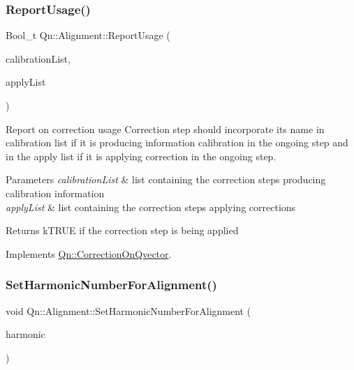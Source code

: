 \mbox{\label{classQn_1_1Alignment_af8ef33833778e9af4bdb7b82f679c941}} 
\subsubsection{\texorpdfstring{Report\+Usage()}{ReportUsage()}}
{\footnotesize\ttfamily Bool\+\_\+t Qn\+::\+Alignment\+::\+Report\+Usage (\begin{DoxyParamCaption}\item[{T\+List $\ast$}]{calibration\+List,  }\item[{T\+List $\ast$}]{apply\+List }\end{DoxyParamCaption})\hspace{0.3cm}{\ttfamily [virtual]}}

Report on correction usage Correction step should incorporate its name in calibration list if it is producing information calibration in the ongoing step and in the apply list if it is applying correction in the ongoing step. 
\begin{DoxyParams}{Parameters}
{\em calibration\+List} & list containing the correction steps producing calibration information \\
\hline
{\em apply\+List} & list containing the correction steps applying corrections \\
\hline
\end{DoxyParams}
\begin{DoxyReturn}{Returns}
k\+T\+R\+UE if the correction step is being applied 
\end{DoxyReturn}


Implements \mbox{\hyperlink{classQn_1_1CorrectionOnQvector_a322860c299f0ca1db46ddd57c0828ba1}{Qn\+::\+Correction\+On\+Qvector}}.

\mbox{\label{classQn_1_1Alignment_ae8e25ee857f8773757ba3936a8da9b70}} 
\subsubsection{\texorpdfstring{Set\+Harmonic\+Number\+For\+Alignment()}{SetHarmonicNumberForAlignment()}}
{\footnotesize\ttfamily void Qn\+::\+Alignment\+::\+Set\+Harmonic\+Number\+For\+Alignment (\begin{DoxyParamCaption}\item[{Int\+\_\+t}]{harmonic }\end{DoxyParamCaption})\hspace{0.3cm}{\ttfamily [inline]}}

